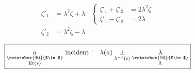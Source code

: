 \[
\begin{aligned}
\zeta'_1&=\lambda^2\zeta+\lambda & \left\{\begin{aligned}\zeta'_1+\zeta'_2&=2\lambda^2\zeta\\\zeta'_1-\zeta'_2&=2\lambda\end{aligned}\right.\\[-1.8ex]
\zeta'_2&=\lambda^2\zeta-\lambda
\end{aligned}
\]

\[
\boxed{\underset{\substack{\rotatebox{90}{$\in$}\\\mathrm{Et}(s)}}{a}\ \text{incident :}\quad \lambda(a)\underset{\lambda^{-1}(s)}{\overset{\cdot}{\pm}}\underset{\substack{\rotatebox{90}{$\in$}\\\Lambda}}{\lambda}}
\]


